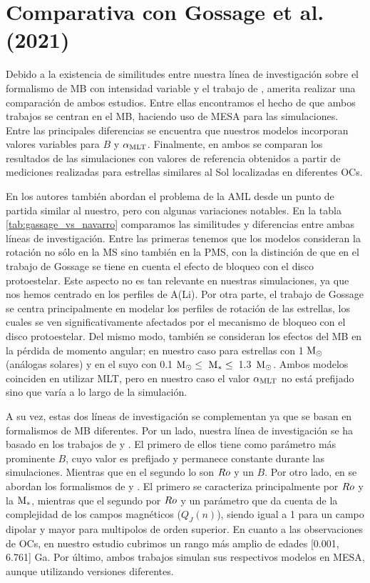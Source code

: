 \section{Comparativa con Gossage et al. (2021)}
Debido a la existencia de similitudes entre nuestra línea de investigación sobre el formalismo de MB con intensidad variable y el trabajo de \cite{Gossage2021}, amerita realizar una comparación de ambos estudios. Entre ellas encontramos el hecho de que ambos trabajos se centran en el MB, haciendo uso de MESA para las simulaciones. Entre las principales diferencias se encuentra que nuestros modelos incorporan valores variables para $B$ y $\alpha_{\mathrm{MLT}}$. Finalmente, en ambos se comparan los resultados de las simulaciones con valores de referencia obtenidos a partir de mediciones realizadas para estrellas similares al Sol localizadas en diferentes OCs.\par

En \cite{Gossage2021} los autores también abordan el problema de la AML desde un punto de partida similar al nuestro, pero con algunas variaciones notables. En la tabla \ref{tab:gassage_vs_navarro} comparamos las similitudes y diferencias entre ambas líneas de investigación. Entre las primeras tenemos que los modelos consideran la rotación no sólo en la MS sino también en la PMS, con la distinción de que en el trabajo de Gossage se tiene en cuenta el efecto de bloqueo con el disco protoestelar. Este aspecto no es tan relevante en nuestras simulaciones, ya que nos hemos centrado en los perfiles de A(Li). Por otra parte, el trabajo de Gossage se centra principalmente en modelar los perfiles de rotación de las estrellas, los cuales se ven significativamente afectados por el mecanismo de bloqueo con el disco protoestelar. Del mismo modo, también se consideran los efectos del MB en la pérdida de momento angular; en nuestro caso para estrellas con 1 $\mathrm{M}_\odot$ (análogas solares) y en el suyo con 0.1 $\mathrm{M}_\odot \le$\, $\mathrm{M}_* \le$\, 1.3 \,$\mathrm{M}_\odot$. Ambos modelos coinciden en utilizar MLT, pero en nuestro caso el valor $\alpha_{\mathrm{MLT}}$ no está prefijado sino que varía a lo largo de la simulación.\par

A su vez, estas dos líneas de investigación se complementan ya que se basan en formalismos de MB diferentes. Por un lado, nuestra línea de investigación se ha basado en los trabajos de \cite{Ud-Doula2007} y \cite{Gallet2013}. El primero de ellos tiene como parámetro más prominente $B$, cuyo valor es prefijado y permanece constante durante las simulaciones. Mientras que en el segundo lo son $Ro$ y un $B$. Por otro lado, en \cite{Gossage2021} se abordan los formalismos de \cite{Matt2015} y \cite{Garraffo2018}. El primero se caracteriza principalmente por $Ro$ y la $\mathrm{M}_*$, mientras que el segundo por $Ro$ y un parámetro que da cuenta de la complejidad de los campos magnéticos ($Q_J(n)$), siendo igual a 1 para un campo dipolar y mayor para multipolos de orden superior. En cuanto a las observaciones de OCs, en nuestro estudio cubrimos un rango más amplio de edades [0.001, 6.761] Ga. Por último, ambos trabajos simulan sus respectivos modelos en MESA, aunque utilizando versiones diferentes.\par

